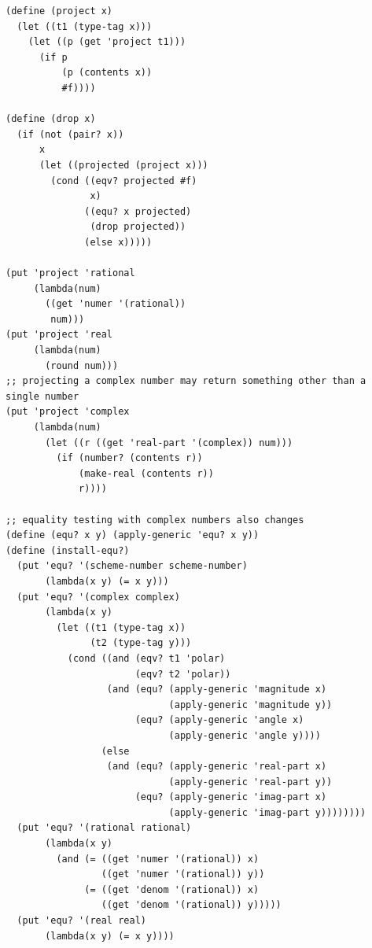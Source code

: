 \documentclass[final,fleqn,titlepage,twoside]{article}
\begin{document}
\begin{verbatim}
(define (project x)
  (let ((t1 (type-tag x)))
    (let ((p (get 'project t1)))
      (if p
          (p (contents x))
          #f))))

(define (drop x)
  (if (not (pair? x))
      x
      (let ((projected (project x)))
        (cond ((eqv? projected #f)
               x)
              ((equ? x projected)
               (drop projected))
              (else x)))))

(put 'project 'rational
     (lambda(num)
       ((get 'numer '(rational))
        num)))
(put 'project 'real
     (lambda(num)
       (round num)))
;; projecting a complex number may return something other than a single number
(put 'project 'complex
     (lambda(num)
       (let ((r ((get 'real-part '(complex)) num)))
         (if (number? (contents r))
             (make-real (contents r))
             r))))

;; equality testing with complex numbers also changes
(define (equ? x y) (apply-generic 'equ? x y))
(define (install-equ?)
  (put 'equ? '(scheme-number scheme-number)
       (lambda(x y) (= x y)))
  (put 'equ? '(complex complex)
       (lambda(x y)
         (let ((t1 (type-tag x))
               (t2 (type-tag y)))
           (cond ((and (eqv? t1 'polar)
                       (eqv? t2 'polar))
                  (and (equ? (apply-generic 'magnitude x)
                             (apply-generic 'magnitude y))
                       (equ? (apply-generic 'angle x)
                             (apply-generic 'angle y))))
                 (else
                  (and (equ? (apply-generic 'real-part x)
                             (apply-generic 'real-part y))
                       (equ? (apply-generic 'imag-part x)
                             (apply-generic 'imag-part y))))))))
  (put 'equ? '(rational rational)
       (lambda(x y)
         (and (= ((get 'numer '(rational)) x)
                 ((get 'numer '(rational)) y))
              (= ((get 'denom '(rational)) x)
                 ((get 'denom '(rational)) y)))))
  (put 'equ? '(real real)
       (lambda(x y) (= x y))))
\end{verbatim}
\end{document}
